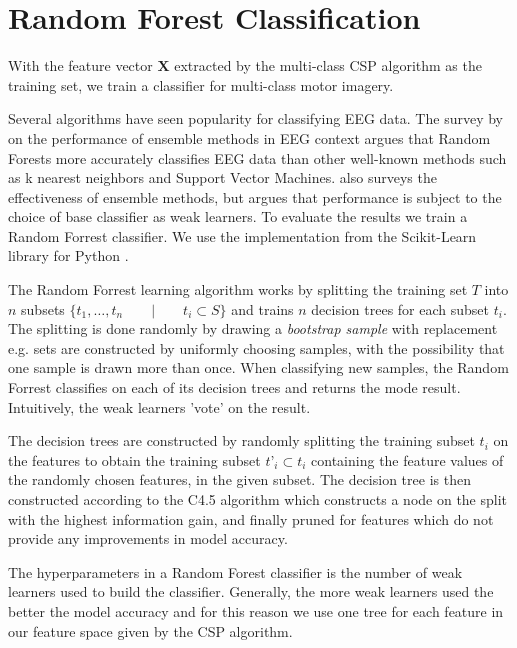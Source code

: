 \section{Random Forest Classification}

With the feature vector $\mathbf{X}$ extracted by the multi-class CSP algorithm as the training set, we train a classifier for multi-class motor imagery.

Several algorithms have seen popularity for classifying EEG data. The survey by \citet{chan2015systematic} on the performance of ensemble methods in EEG context argues that Random Forests more accurately classifies EEG data than other well-known methods such as k nearest neighbors and Support Vector Machines. \citet{sun2007experimental} also surveys the effectiveness of ensemble methods, but argues that performance is subject to the choice of base classifier as weak learners. To evaluate the results we train a Random Forrest classifier. We use the implementation from the Scikit-Learn library for Python \citep{scikit-learn}.   

The Random Forrest learning algorithm works by splitting the training set $T$ into $n$ subsets $\{t_1,…,t_n \qquad | \qquad t_i \subset S\}$ and trains $n$ decision trees for each subset $t_i$. The splitting is done randomly by drawing a \emph{bootstrap sample} with replacement e.g. sets are constructed by uniformly choosing samples, with the possibility that one sample is drawn more than once. When classifying new samples, the Random Forrest classifies on each of its decision trees and returns the mode result. Intuitively, the weak learners 'vote' on the result.

The decision trees are constructed by randomly splitting the training subset $t_i$ on the features to obtain the training subset $t’_i \subset t_i$ containing the feature values of the randomly chosen features, in the given subset. The decision tree is then constructed according to the C4.5 algorithm which constructs a node on the split with the highest information gain, and finally pruned for features which do not provide any improvements in model accuracy.

The hyperparameters in a Random Forest classifier is the number of weak learners used to build the classifier. Generally, the more weak learners used the better the model accuracy and for this reason we use one tree for each feature in our feature space given by the CSP algorithm. 